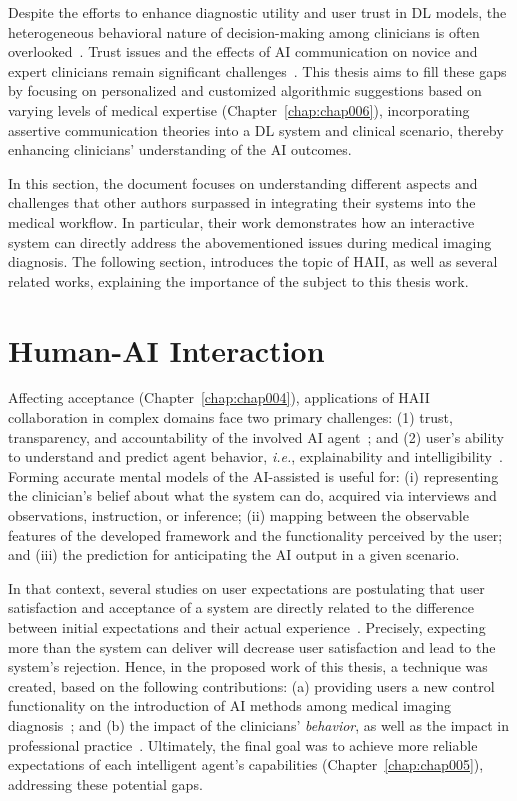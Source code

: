 Despite the efforts to enhance diagnostic utility and user trust in \ac{DL} models, the heterogeneous behavioral nature of decision-making among clinicians is often overlooked~\cite{10.1145/3290605.3300234, 10.1145/3359206}.
Trust issues and the effects of \ac{AI} communication on novice and expert clinicians remain significant challenges~\cite{10.1145/3544548.3580682, 10.1145/3491102.3502104}.
This thesis aims to fill these gaps by focusing on personalized and customized algorithmic suggestions based on varying levels of medical expertise (Chapter~\ref{chap:chap006}), incorporating assertive communication theories into a \ac{DL} system and clinical scenario, thereby enhancing clinicians' understanding of the \ac{AI} outcomes.

In this section, the document focuses on understanding different aspects and challenges that other authors surpassed in integrating their systems into the medical workflow.
In particular, their work demonstrates how an interactive system can directly address the abovementioned issues during medical imaging diagnosis.
The following section, introduces the topic of \ac{HAII}, as well as several related works, explaining the importance of the subject to this thesis work.

\section{Human-AI Interaction}
\label{sec:chap003002}

\textcolor{revised}{Affecting acceptance (Chapter~\ref{chap:chap004})}, applications of \ac{HAII} collaboration in complex domains face two primary challenges:
(1) trust, transparency, and accountability of the involved \ac{AI} agent~\cite{10.1145/3290605.3300233}; and
(2) user's ability to understand and predict agent behavior, {\it i.e.}, explainability and intelligibility~\cite{Cai:2019:EEE:3301275.3302289}.
Forming accurate mental models of the \ac{AI}-assisted is useful for:
(i) representing the clinician's belief about what the system can do, acquired via interviews and observations, instruction, or inference;
(ii) mapping between the observable features of the developed framework and the functionality perceived by the user; and
(iii) the prediction for anticipating the \ac{AI} output in a given scenario.

In that context, several studies on user expectations are postulating that user satisfaction and acceptance of a system are directly related to the difference between initial expectations and their actual experience~\cite{Kocielnik:2019:YAI:3290605.3300641}.
Precisely, expecting more than the system can deliver will decrease user satisfaction and lead to the system's rejection.
Hence, in the proposed work of this thesis, a technique was created, based on the following contributions:
(a) providing users a new control functionality on the introduction of \ac{AI} methods among medical imaging diagnosis~\cite{pesapane2018artificial}; and
(b) the impact of the clinicians' {\it behavior}, as well as the impact in professional practice~\cite{CALISTO2021102607}.
Ultimately, the final goal was to achieve more reliable expectations of each intelligent agent's capabilities (Chapter~\ref{chap:chap005}), addressing these potential gaps.

